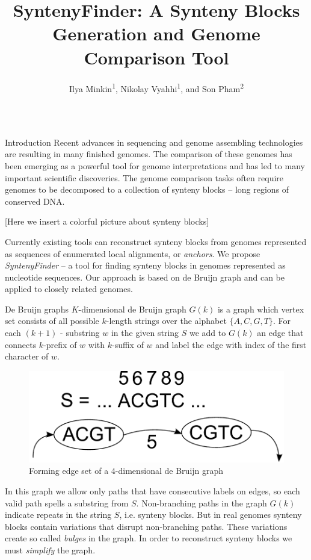 \documentclass[final,hyperref={pdfpagelabels=false}]{beamer}
\title{SyntenyFinder: A Synteny Blocks Generation and Genome Comparison Tool}
\author{Ilya Minkin\textsuperscript{1}, Nikolay Vyahhi\textsuperscript{1}, and Son Pham\textsuperscript{2}}
\institute{\textsuperscript{1} St. Petersburg Academic University, St. Petersburg, Russia \\ \textsuperscript{2} University of California, San Diego, USA}
\begin{document}
\begin{frame}{}

\begin{columns}[t]

\begin{column}{0.32\linewidth}

\begin{block}{Introduction} \justifying
Recent advances in sequencing and genome assembling technologies are resulting in many finished genomes.
The comparison of these genomes has been emerging as a powerful tool for genome interpretations and has led to many important scientific discoveries.
The genome comparison tasks often require genomes to be  decomposed to a collection of synteny blocks -- long regions of conserved DNA.

[Here we insert a colorful picture about synteny blocks]

Currently existing tools can reconstruct synteny blocks from genomes represented as sequences of enumerated local alignments, or \textit{anchors}.
We propose \textit{SyntenyFinder} -- a tool for finding synteny blocks in genomes represented as nucleotide sequences. Our approach is based on de Bruijn graph
and can be applied to closely related genomes.
\end{block}

\begin{block}{De Bruijn graphs} \justifying
\(K\)-dimensional de Bruijn graph \(G(k)\) is a graph which vertex set consists of all possible \(k\)-length strings over the alphabet \(\lbrace A, C, G, T \rbrace\). 
For each \((k + 1)\) - substring \(w\) in the given string \(S\) we add to \(G(k)\) an edge that connects \(k\)-prefix of \(w\) with \(k\)-suffix of \(w\) and label the edge with
index of the first character of \(w\).
\begin{figure}
	\includegraphics[scale = 0.6]{deBruijnEdge.pdf}
	\small \caption{Forming edge set of a \(4\)-dimensional de Bruijn graph}
\end{figure}
In this graph we allow only paths that have consecutive labels on edges, so each valid path spells a substring from \(S\).
Non-branching paths in the graph \(G(k)\) indicate repeats in the string \(S\), i.e. synteny blocks. But in real genomes
synteny blocks contain variations that disrupt non-branching paths. These variations create so called \textit{bulges} in
the graph. In order to reconstruct synteny blocks we must \textit{simplify} the graph.
\end{block}


\end{column}
\end{columns}
\end{frame}
\end{document}
